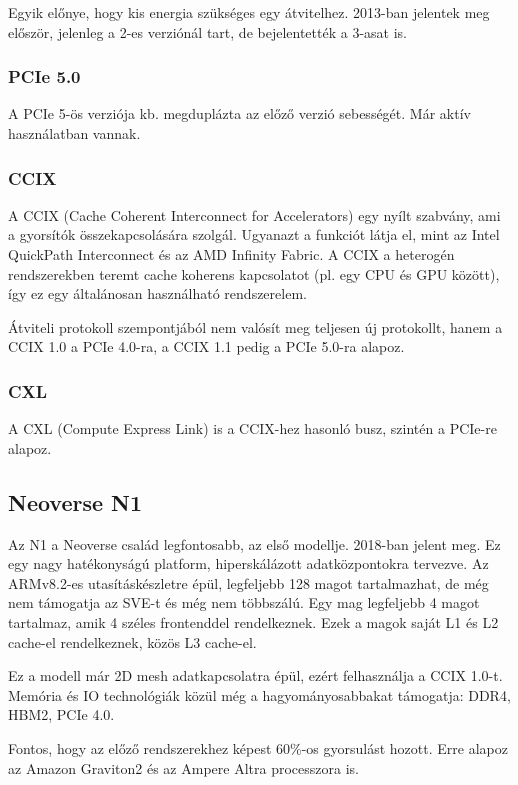 Egyik előnye, hogy kis energia szükséges egy átvitelhez.
2013-ban jelentek meg először, jelenleg a 2-es verziónál tart, de bejelentették a 3-asat is.

\subsubsection{PCIe 5.0}
A PCIe 5-ös verziója kb. megduplázta az előző verzió sebességét.
Már aktív használatban vannak.

\subsubsection{CCIX}
A CCIX (Cache Coherent Interconnect for Accelerators) egy nyílt szabvány, ami a gyorsítók összekapcsolására szolgál.
Ugyanazt a funkciót látja el, mint az Intel QuickPath Interconnect és az AMD Infinity Fabric.
A CCIX a heterogén rendszerekben teremt cache koherens kapcsolatot (pl. egy CPU és GPU között), így ez egy általánosan használható rendszerelem.

Átviteli protokoll szempontjából nem valósít meg teljesen új protokollt, hanem a CCIX 1.0 a PCIe 4.0-ra, a CCIX 1.1 pedig a PCIe 5.0-ra alapoz.

\subsubsection{CXL}
A CXL (Compute Express Link) is a CCIX-hez hasonló busz, szintén a PCIe-re alapoz.

\subsection{Neoverse N1}
Az N1 a Neoverse család legfontosabb, az első modellje.
2018-ban jelent meg.
Ez egy nagy hatékonyságú platform, hiperskálázott adatközpontokra tervezve.
Az ARMv8.2-es utasításkészletre épül, legfeljebb 128 magot tartalmazhat, de még nem támogatja az SVE-t és még nem többszálú.
Egy mag legfeljebb 4 magot tartalmaz, amik 4 széles frontenddel rendelkeznek.
Ezek a magok saját L1 és L2 cache-el rendelkeznek, közös L3 cache-el.

Ez a modell már 2D mesh adatkapcsolatra épül, ezért felhasználja a CCIX 1.0-t.
Memória és IO technológiák közül még a hagyományosabbakat támogatja: DDR4, HBM2, PCIe 4.0.

Fontos, hogy az előző rendszerekhez képest 60\%-os gyorsulást hozott.
Erre alapoz az Amazon Graviton2 és az Ampere Altra processzora is.

